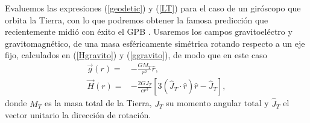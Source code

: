 Evaluemos las expresiones (\ref{geodetic}) y (\ref{LT}) para el caso de un giróscopo que orbita la Tierra, con lo que podremos obtener la famosa predicción que recientemente midió con éxito el GPB \cite{Everitt11}. Usaremos los campos gravitoeléctro y gravitomagnético, de una masa esféricamente simétrica rotando respecto a un eje fijo, calculados en (\ref{Hgravito}) y (\ref{ggravito}), de modo que en este caso
\begin{align}
\vec{g}(r)={}&-\frac{GM_T}{r^2}\hat{r},\label{gGPB}\\
\vec{H}(r)={}&-\frac{2GJ_T}{cr^3}\left[3(\hat{J}_T\cdot\hat{r})\hat{r}-\hat{J}_T\right]\label{BGPB},
\end{align}
donde $M_T$ es la masa total de la Tierra, $J_T$ su momento angular total y $\hat{J}_T$ el vector unitario la dirección de rotación.

